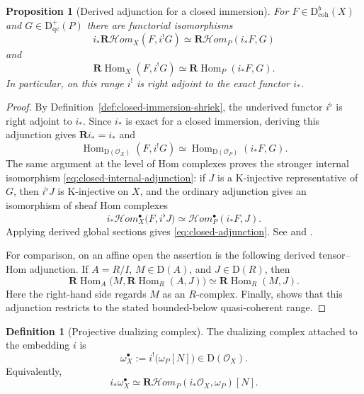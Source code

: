 \documentclass[11pt,a4paper]{article}
\newtheorem{proposition}[theorem]{Proposition}
\theoremstyle{definition}
\newtheorem{definition}[theorem]{Definition}
\theoremstyle{remark}
\newcommand{\OO}{\mathcal O}
\newcommand{\Hom}{\operatorname{Hom}}
\newcommand{\shHom}{\mathcal H\!om}
\newcommand{\RHom}{\mathbf R\!\operatorname{Hom}}
\newcommand{\RshHom}{\mathbf R\!\mathcal H\!om}
\newcommand{\D}{\mathrm D}
\newcommand{\Dbcoh}{\mathrm D^b_{\mathrm{coh}}}
\begin{document}
\begin{proposition}[Derived adjunction for a closed immersion]
\label{prop:closed-adjunction}
For $F\in\Dbcoh(X)$ and $G\in\D^+_{\mathrm{qc}}(P)$ there are functorial
isomorphisms
\begin{equation}\label{eq:closed-internal-adjunction}
  i_*\RshHom_X(F,i^!G)
  \simeq\RshHom_P(i_*F,G)
\end{equation}
and
\begin{equation}\label{eq:closed-adjunction}
  \RHom_X(F,i^!G)\simeq\RHom_P(i_*F,G).
\end{equation}
In particular, on this range $i^!$ is right adjoint to the exact functor
$i_*$.
\end{proposition}

\begin{proof}
By Definition~\ref{def:closed-immersion-shriek}, the underived functor
$i^\flat$ is right adjoint to $i_*$. Since $i_*$ is exact for a closed
immersion, deriving this adjunction gives $\mathbf Ri_*=i_*$ and
\[
  \Hom_{\D(\OO_X)}(F,i^!G)
  \simeq\Hom_{\D(\OO_P)}(i_*F,G).
\]
The same argument at the level of Hom complexes proves the stronger
internal isomorphism \eqref{eq:closed-internal-adjunction}: if $J$ is a K-injective
representative of $G$, then $i^\flat J$ is K-injective on $X$, and the
ordinary adjunction gives an isomorphism of sheaf Hom complexes
\[
  i_*\shHom_X^\bullet\bigl(F,i^\flat J\bigr)
  \simeq \shHom_P^\bullet(i_*F,J).
\]
Applying derived global sections gives \eqref{eq:closed-adjunction}. See
\cite[Tags 0A75, 0A76, and 0E2I]{Stacks} and
\cite[Corollary 4.4.2]{LipmanNotes}.

For comparison, on an affine open the assertion is the following derived
tensor--Hom adjunction. If $A=R/I$, $M\in\D(A)$, and $J\in\D(R)$, then
\[
  \RHom_A\bigl(M,\RHom_R(A,J)\bigr)
  \simeq\RHom_R(M,J).
\]
Here the right-hand side regards $M$ as an $R$-complex. Finally,
\cite[Tag 0A9X]{Stacks} shows that this adjunction restricts to the stated
bounded-below quasi-coherent range.
\end{proof}

\begin{definition}[Projective dualizing complex]
\label{def:dualizing-complex}
The dualizing complex attached to the embedding $i$ is
\begin{equation}\label{eq:def-dualizing-complex}
  \omega_X^\bullet
  :=i^!\bigl(\omega_P[N]\bigr)
  \in\D(\OO_X).
\end{equation}
Equivalently,
\[
  i_*\omega_X^\bullet
  \simeq\RshHom_P(i_*\OO_X,\omega_P)[N].
\]
\end{definition}
\end{document}
